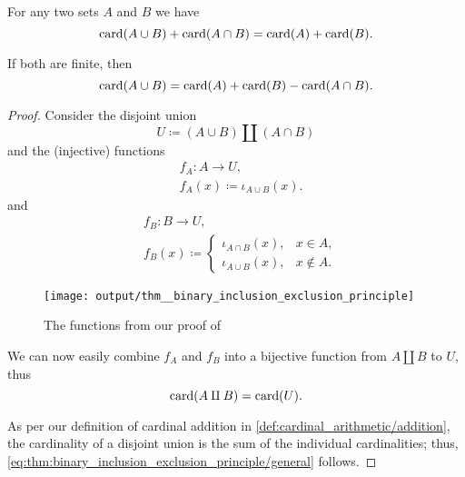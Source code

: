 \begin{theorem}\label{thm:binary_inclusion_exclusion_principle}
  For any two sets \( A \) and \( B \) we have
  \begin{equation}\label{eq:thm:binary_inclusion_exclusion_principle/general}
    \operatorname{card}(A \cup B) + \operatorname{card}(A \cap B) = \operatorname{card}(A) + \operatorname{card}(B).
  \end{equation}

  If both are finite, then
  \begin{equation}\label{eq:thm:binary_inclusion_exclusion_principle/finite}
    \operatorname{card}(A \cup B) = \operatorname{card}(A) + \operatorname{card}(B) - \operatorname{card}(A \cap B).
  \end{equation}
\end{theorem}
\begin{proof}
  Consider the disjoint union
  \begin{equation*}
    U \coloneqq (A \cup B) \amalg (A \cap B)
  \end{equation*}
  and the (injective) functions
  \begin{equation*}
    \begin{aligned}
      &f_A: A \to U, \\
      &f_A(x) \coloneqq \iota_{A \cup B}(x).
    \end{aligned}
  \end{equation*}
  and
  \begin{equation*}
    \begin{aligned}
      &f_B: B \to U, \\
      &f_B(x) \coloneqq \begin{cases}
        \iota_{A \cap B}(x), &x \in A, \\
        \iota_{A \cup B}(x), &x \not\in A.
      \end{cases}
    \end{aligned}
  \end{equation*}

  \begin{figure}[!ht]
    \centering
    \texttt{[image: output/thm\_\_binary\_inclusion\_exclusion\_principle]}
    \caption{The functions from our proof of }\label{fig:thm:binary_inclusion_exclusion_principle}
  \end{figure}

  We can now easily combine \( f_A \) and \( f_B \) into a bijective function from \( A \amalg B \) to \( U \), thus
  \begin{equation*}
    \operatorname{card}(A \amalg B) = \operatorname{card}(U).
  \end{equation*}

  As per our definition of cardinal addition in \cref{def:cardinal_arithmetic/addition}, the cardinality of a disjoint union is the sum of the individual cardinalities; thus, \eqref{eq:thm:binary_inclusion_exclusion_principle/general} follows.
\end{proof}

